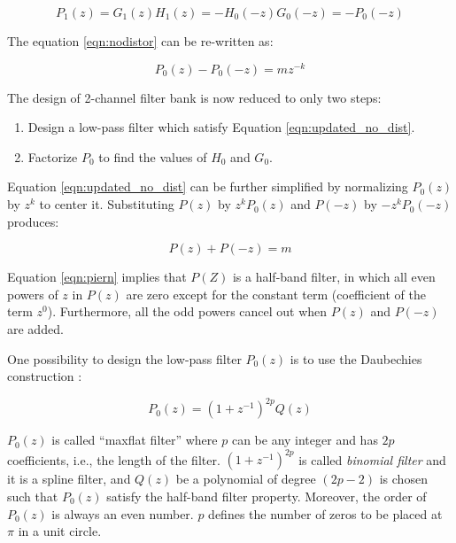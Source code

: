 \begin{equation} 
{P_1(z) = G_{1}(z)H_{1}(z) = -H_{0}(-z)G_{0}(-z) = -P_0(-z)}
\end{equation}

The equation \ref{eqn:nodistor} can be re-written as:

\begin{equation}\label{eqn:updated_no_dist} 
{P_0(z) - P_0(-z) =  mz^{-k}}
\end{equation}

The design of 2-channel filter bank is now reduced to only two steps:

\begin{enumerate}
	\item Design a low-pass filter which satisfy Equation \ref{eqn:updated_no_dist}.
	\item Factorize $P_0$ to find the values of $H_0$ and $G_0$.
\end{enumerate}

Equation \ref{eqn:updated_no_dist} can be further simplified by normalizing $P_0(z)$ by $z^k$ to center it. Substituting $P(z)$ by $z^kP_0(z)$ and $P(-z)$ by $-z^kP_0(-z)$ produces:


\begin{equation}\label{eqn:piern} 
{P(z) + P(-z) =  m}
\end{equation}

Equation \ref{eqn:piern} implies that $P(Z)$ is a half-band filter, in which all even powers of $z$ in $P(z)$ are zero except for the constant term (coefficient of the term $z^0$). Furthermore, all the odd powers cancel out when $P(z)$ and $P(-z)$ are added. 


One possibility to design the low-pass filter $P_0(z)$ is to use the Daubechies construction \cite{strang1996wavelets}:

\begin{equation}\label{eqn:daubechies} 
{P_0(z) = (1 + z^{-1})^{2p}Q(z)}
\end{equation}

$P_0(z)$ is called ``maxflat filter'' where $p$ can be any integer and has $2p$ coefficients, i.e., the length of the filter. $(1 + z^{-1})^{2p}$ is called \textit{binomial filter} and it is a spline filter, and $Q(z)$ be a polynomial of degree $(2p-2)$ is chosen such that $P_0(z)$ satisfy  the half-band filter property. Moreover, the order of $P_0(z)$ is always an even number. $p$ defines the number of zeros to be placed at $\pi$ in a unit circle. 


